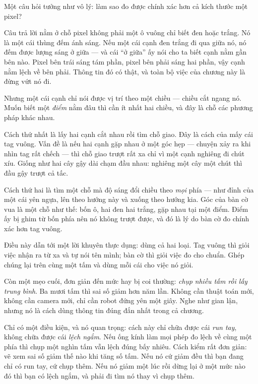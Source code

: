 \documentclass[../../marker.tex]{subfiles}
\begin{document}
\begin{dongian}
Một câu hỏi tưởng như vô lý: làm sao đo được chính xác hơn cả kích thước một pixel?

Câu trả lời nằm ở chỗ pixel không phải một ô vuông chỉ biết đen hoặc trắng. Nó là một cái thùng đếm ánh sáng. Nếu một cái cạnh đen trắng đi qua giữa nó, nó đếm được lượng sáng ở giữa --- và cái ``ở giữa'' ấy nói cho ta biết cạnh nằm gần bên nào. Pixel bên trái sáng tám phần, pixel bên phải sáng hai phần, vậy cạnh nằm lệch về bên phải. Thông tin đó có thật, và toàn bộ việc của chương này là đừng vứt nó đi.

Nhưng một cái cạnh chỉ nói được vị trí theo một chiều --- chiều cắt ngang nó. Muốn biết một \emph{điểm} nằm đâu thì cần ít nhất hai chiều, và đây là chỗ các phương pháp khác nhau.

Cách thứ nhất là lấy hai cạnh cắt nhau rồi tìm chỗ giao. Đây là cách của mấy cái tag vuông. Vấn đề là nếu hai cạnh gặp nhau ở một góc hẹp --- chuyện xảy ra khi nhìn tag rất chếch --- thì chỗ giao trượt rất xa chỉ vì một cạnh nghiêng đi chút xíu. Giống như hai cây gậy dài chạm đầu nhau: nghiêng một cây một chút thì đầu gậy trượt cả tấc.

Cách thứ hai là tìm một chỗ mà độ sáng đổi chiều theo \emph{mọi} phía --- như đỉnh của một cái yên ngựa, lên theo hướng này và xuống theo hướng kia. Góc của bàn cờ vua là một chỗ như thế: bốn ô, hai đen hai trắng, gặp nhau tại một điểm. Điểm ấy bị ghim từ bốn phía nên nó không trượt được, và đó là lý do bàn cờ đo chính xác hơn tag vuông.

Điều này dẫn tới một lời khuyên thực dụng: dùng cả hai loại. Tag vuông thì giỏi việc nhận ra từ xa và tự nói tên mình; bàn cờ thì giỏi việc đo cho chuẩn. Ghép chúng lại trên cùng một tấm và dùng mỗi cái cho việc nó giỏi.

Còn một mẹo cuối, đơn giản đến mức hay bị coi thường: \emph{chụp nhiều tấm rồi lấy trung bình}. Ba mươi tấm thì sai số giảm hơn năm lần. Không cần thuật toán mới, không cần camera mới, chỉ cần robot đứng yên một giây. Nghe như gian lận, nhưng nó là cách dùng thông tin đúng đắn nhất trong cả chương.

Chỉ có một điều kiện, và nó quan trọng: cách này chỉ chữa được cái \emph{run tay}, không chữa được cái \emph{lệch ngắm}. Nếu ống kính làm mọi phép đo lệch về cùng một phía thì chụp một nghìn tấm vẫn lệch đúng bấy nhiêu. Cách kiểm rất đơn giản: vẽ xem sai số giảm thế nào khi tăng số tấm. Nếu nó cứ giảm đều thì bạn đang chỉ có run tay, cứ chụp thêm. Nếu nó giảm một lúc rồi dừng lại ở một mức nào đó thì bạn có lệch ngắm, và phải đi tìm nó thay vì chụp thêm.

\end{dongian}
\end{document}
